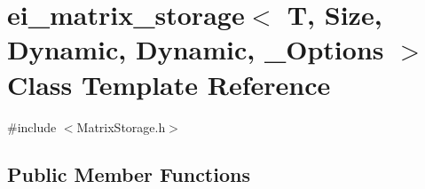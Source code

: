 \hypertarget{classei__matrix__storage_3_01_t_00_01_size_00_01_dynamic_00_01_dynamic_00_01___options_01_4}{\section{ei\-\_\-matrix\-\_\-storage$<$ T, Size, Dynamic, Dynamic, \-\_\-\-Options $>$ Class Template Reference}
\label{classei__matrix__storage_3_01_t_00_01_size_00_01_dynamic_00_01_dynamic_00_01___options_01_4}
}


{\ttfamily \#include $<$Matrix\-Storage.\-h$>$}

\subsection*{Public Member Functions}
